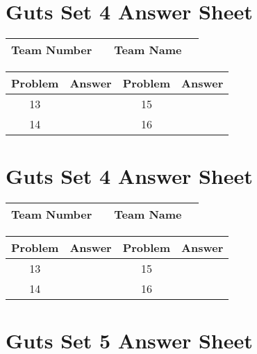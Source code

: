 \documentclass[14pt]{article}
\begin{document}
\vspace{30px}

\section*{Guts Set 4 Answer Sheet}

\begin{center}
\begin{tabular}{|r|r|r|r|}
\hline
	Team Number & \hspace{10em} &
	Team Name & \hspace{15em} \\ \hline
\end{tabular}
\end{center}
\begin{tabularx}{\textwidth}{|c|l|c|X|}\hline
	Problem & Answer & Problem & Answer \\\hline
	13 & \hspace{15em} & 15 & \\\hline
	14 & & 16 & \\\hline
\end{tabularx}

\vspace{30px}

\section*{Guts Set 4 Answer Sheet}

\begin{center}
\begin{tabular}{|r|r|r|r|}
\hline
	Team Number & \hspace{10em} &
	Team Name & \hspace{15em} \\ \hline
\end{tabular}
\end{center}
\begin{tabularx}{\textwidth}{|c|l|c|X|}\hline
	Problem & Answer & Problem & Answer \\\hline
	13 & \hspace{15em} & 15 & \\\hline
	14 & & 16 & \\\hline
\end{tabularx}

\section*{Guts Set 5 Answer Sheet}
\end{document}
